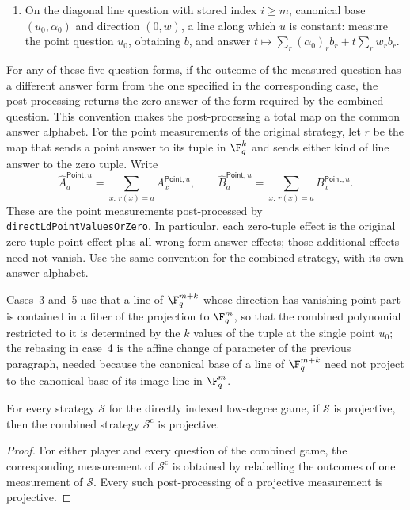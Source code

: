 \begin{definition}
\begin{enumerate}
		$t \mapsto \sum_r \bigl((\alpha_0)_r + t\, w_r\bigr) f_r(t)$, of degree
		at most $md+1 \le (m+k)d$.
		\item On the diagonal line question with stored index $i \ge m$,
		canonical base $(u_0,\alpha_0)$ and direction $(0,w)$, a line along which
		$u$ is constant: measure the point question $u_0$, obtaining $b$, and
		answer $t \mapsto \sum_r (\alpha_0)_r b_r + t \sum_r w_r b_r$.
	\end{enumerate}
	For any of these five question forms, if the outcome of the measured
	question has a different answer form from the one specified in the
	corresponding case, the post-processing returns the zero answer of the form
	required by the combined question.  This convention makes the
	post-processing a total map on the common answer alphabet.
	For the point measurements of the original strategy, let $r$ be the map
	that sends a point answer to its tuple in $\F_q^k$ and sends either kind of
	line answer to the zero tuple.  Write
	\[
		\widehat A^{\mathsf{Point},u}_a
		= \sum_{x:\,r(x)=a} A^{\mathsf{Point},u}_x,
		\qquad
		\widehat B^{\mathsf{Point},u}_a
		= \sum_{x:\,r(x)=a} B^{\mathsf{Point},u}_x.
	\]
	These are the point measurements post-processed by
	\texttt{directLdPointValuesOrZero}.  In particular, each zero-tuple effect
	is the original zero-tuple point effect plus all wrong-form answer effects;
	those additional effects need not vanish.  Use the same convention for the
	combined strategy, with its own answer alphabet.

	Cases~3 and~5 use that a line of $\F_q^{m+k}$ whose direction
	has vanishing point part is contained in a fiber of the projection to
	$\F_q^m$, so that the combined polynomial restricted to it is determined by
	the $k$ values of the tuple at the single point $u_0$; the rebasing in
	case~4 is the affine change of parameter of the previous paragraph, needed
	because the
	canonical base of a line of $\F_q^{m+k}$ need not project to the canonical
	base of its image line in $\F_q^m$.
\end{definition}

\begin{theorem}
	\label{thm:ld-combined-strategy-projective}
	\leanok
	For every strategy $\mathcal S$ for the directly indexed low-degree game, if
	$\mathcal S$ is projective, then the combined strategy
	$\mathcal S^{\mathrm c}$ is projective.
\end{theorem}
\begin{proof}
	\leanok
	For either player and every question of the combined game, the corresponding
	measurement of $\mathcal S^{\mathrm c}$ is obtained by relabelling the outcomes
	of one measurement of $\mathcal S$.  Every such post-processing of a
	projective measurement is projective.
\end{proof}

